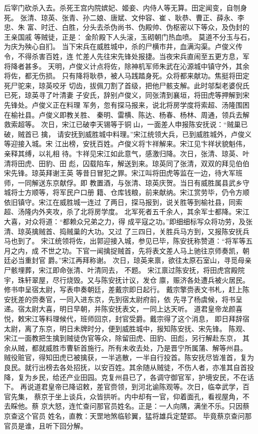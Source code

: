 后宰门砍杀入去。杀死王宫内院嫔妃、姬妾、内侍人等无算。田定闻变，自刎身死。
张清、琼英、张青、孙二娘、唐斌、文仲容、崔、耿恭、曹正、薛永、李忠、朱
富、时迁、白胜，分头去杀伪尚书、伪殿帅、伪枢密以下等众，及伪封的王亲国戚
等贼徒，正是：
金阶殿下人头滚，玉砌朝门热血喷。
莫道不分玉与石，为庆为殃心自扪。
当下宋兵在威胜城中，杀的尸横市井，血满沟渠。卢俊义传令，不得杀害百姓，连
忙差人先往宋先锋处报捷。当夜宋兵直闹至五更方息，军将降者甚多。
天明，卢俊义计点将佐，除神机军师朱武在沁源城中镇守外，其余将佐，都无伤损。
只有降将耿恭，被人马践踏身死。众将都来献功。焦挺将田定死尸驼来，琼英咬牙
切齿，拔佩刀割了首级，把他尸骸支解。此时邬梨老婆倪氏已死，琼英寻了叶清妻
子安氏，辞别卢俊义，同张清到襄垣，将田虎等押解到宋先锋处。卢俊义正在料理
军务，忽有探马报来，说北将房学度将索超、汤隆围困在榆社县。卢俊义即教关胜、
秦明、雷横、陈达、杨春、杨林、周通，领兵去解救索超等。
次日，宋江已破李天锡等于铜山，一面差人申报陈安抚说：“贼巢已破，贼首已
擒，
请安抚到威胜城中料理。”宋江统领大兵，已到威胜城外，卢俊义等迎接入城。宋
江出榜，安抚百姓。卢俊义将卞祥解来。宋江见卞祥状貌魁伟，亲释其缚，以礼相
待。卞祥见宋江如此意气，感激归降。次日，张清、琼英、叶清将田虎、田豹、田
彪，囚载陷车，解送到来。琼英同了张清，双双的拜见伯伯宋先锋。琼英拜谢王英
等昔日冒犯之罪。宋江叫将田虎等监在一边，待大军班师，一同解送东京献俘。即
教置酒，与张清、琼英庆贺。当日有威胜属县武乡守城将士方顺等，将军民户口册
籍、仓库钱粮，前来献纳。宋江赏劳毕，仍令方顺依旧镇守。宋江在威胜城一连过
了两日，探马报到，说关胜等到榆社县，同索超、汤隆内外夹攻，杀了北将房学度。
北军死者五千余人，其余军士都降。宋江大喜，对众将道：“都赖众兄弟之力，得
成平寇之功。”即细细标写众将功劳，及张清、琼英擒贼首、捣贼巢的大功。又过
了三四日，关胜兵马方到，又报陈安抚兵马也到了。
宋江统领将佐，出郭迎接入城，参见已毕，陈安抚称赞道：“将军等五月之内，成
不世之功。下官一闻擒捉贼首，先将表文差人马上驰往京师奏凯，朝廷必当重封官
爵。”宋江再拜称谢。
次日，琼英来禀，欲往太原石室山，寻觅母亲尸骸埋葬，宋江即命张清、叶清同去，
不题。
宋江禀过陈安抚，将田虎宫殿院宇，珠轩翠屋，尽行烧毁。又与陈安抚计议，发仓
廪，赈济各处遭兵被火居民。修书申呈宿太尉，写表申奏朝廷，差戴宗即日起行。
戴宗擎赍表文书札，赶上陈安抚差的赍奏官，一同入进东京，先到宿太尉府前，依
先寻了杨虞候，将书呈递。宿太尉大喜，明日早朝，并陈安抚表文，一同上达天听。
道君皇帝龙颜喜悦，敕宋江等料理候代，班师回京，封官受爵。戴宗得了这个消息，
即日拜辞宿太尉，离了东京，明日未牌时分，便到威胜城中，报知陈安抚、宋先锋。
陈观、宋江一面教把生擒到贼徒伪官等众，除留田虎、田豹、田彪，另行解赴东京，
其余从贼，都就威胜市曹斩首施行。所有未收去处，乃是晋宁所属蒲、解等州县。
贼役赃官，得知田虎已被擒获，一半逃散，一半自行投首。陈安抚尽皆准首，复为
良民。就行出榜去各处招抚，以安百姓。其余随从贼徒，不伤人者，亦准其自首投
降，复为乡民，给还产业田园。克复州县已了，各调守御官军，护境安民，不在话
下。
再说道君皇帝已降诏敕，差官赍领，到河北谕陈观等。次日，临幸武学，百官先集，
蔡京于坐上谈兵，众皆拱听。内中却有一官，仰着面孔，看视屋角，不去睬他。蔡
京大怒，连忙查问那官员姓名。正是：一人向隅，满坐不乐。只因蔡京查这个官员
姓名，直教：天罡地煞临轸翼，猛将雄兵定楚郢。
毕竟蔡京查问那官员是谁，且听下回分解。
